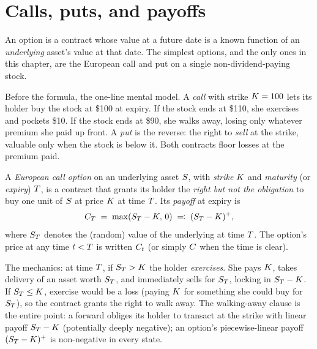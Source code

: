 \section{Calls, puts, and payoffs}
\label{sec:ch14_payoffs}

An option is a contract whose value at a future date is a known
function of an \emph{underlying} asset's value at that date. The
simplest options, and the only ones in this chapter, are the
European call and put on a single non-dividend-paying stock.

Before the formula, the one-line mental model. A \emph{call}
with strike $K = 100$ lets its holder buy the stock at
\$100 at expiry. If the stock ends at \$110, she exercises and
pockets \$10. If the stock ends at \$90, she walks away, losing
only whatever premium she paid up front. A \emph{put} is the
reverse: the right to \emph{sell} at the strike, valuable only
when the stock is below it. Both contracts floor losses at the
premium paid.

\begin{definition}
\label{def:european_call}
A \emph{European call option} on an underlying asset $S$, with
\emph{strike} $K$ and \emph{maturity} (or \emph{expiry})
$T$, is a contract that grants its holder the \emph{right but
not the obligation} to buy one unit of $S$ at price
$K$ at time $T$. Its \emph{payoff} at expiry is
\begin{equation}
  C_T \;=\; \max(S_T - K,\, 0)
       \;\eqqcolon\; (S_T - K)^+,
  \label{eq:call_payoff}
\end{equation}
where $S_T$ denotes the (random) value of the underlying at
time $T$. The option's price at any time $t < T$ is
written $C_t$ (or simply $C$ when the time is clear).
\end{definition}

The mechanics: at time $T$, if $S_T > K$ the holder
\emph{exercises}. She pays $K$, takes delivery of an asset
worth $S_T$, and immediately sells for $S_T$, locking in
$S_T - K$. If $S_T \leq K$, exercise would be
a loss (paying $K$ for something she could buy for
$S_T$), so the contract grants the right to walk away. The
walking-away clause is the entire point: a forward obliges its
holder to transact at the strike with linear payoff
$S_T - K$ (potentially deeply negative); an option's
piecewise-linear payoff $(S_T - K)^+$ is non-negative
in every state.

